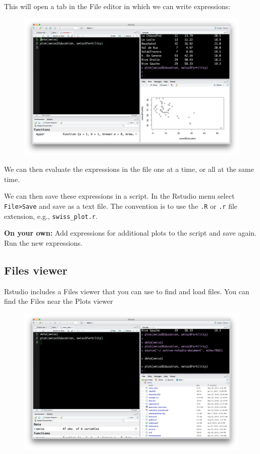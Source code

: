 \documentclass[]{book}
\theoremstyle{definition}
\theoremstyle{definition}
\theoremstyle{remark}
\begin{document}
This will open a tab in the File editor in which we can write
expressions:

\begin{figure}
\centering
\includegraphics{img/rstudio_file.png}
\caption{}
\end{figure}

We can then evaluate the expressions in the file one at a time, or all
at the same time.

We can then save these expressions in a script. In the Rstudio menu
select \texttt{File\textgreater{}Save} and save as a text file. The
convention is to use the \texttt{.R} or \texttt{.r} file extension,
e.g., \texttt{swiss\_plot.r}.

\textbf{On your own:} Add expressions for additional plots to the script
and save again. Run the new expressions.

\subsection{Files viewer}\label{files-viewer}

Rstudio includes a Files viewer that you can use to find and load files.
You can find the Files near the Plots viewer

\begin{figure}
\centering
\includegraphics{img/rstudio_files.png}
\caption{}
\end{figure}
\end{document}
